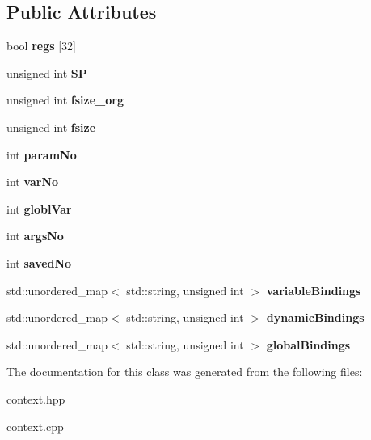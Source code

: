 \subsection*{Public Attributes}
\begin{DoxyCompactItemize}
\item 
\mbox{\label{class_context_a4154d80f029cc2e348126ca70dd43e94}} 
bool {\bfseries regs} \mbox{[}32\mbox{]}
\item 
\mbox{\label{class_context_ac383af2b2294500f1cc0370946df81a6}} 
unsigned int {\bfseries SP}
\item 
\mbox{\label{class_context_a9f5e2ccd0d0d14543080829ebf2d4b5b}} 
unsigned int {\bfseries fsize\+\_\+org}
\item 
\mbox{\label{class_context_a3572ac8a19d4afe52f93236158b3ca6b}} 
unsigned int {\bfseries fsize}
\item 
\mbox{\label{class_context_aac2957f7942a067a4d61db0a9d5fa52b}} 
int {\bfseries param\+No}
\item 
\mbox{\label{class_context_a21e93552ced87fbc90e95fb1adefb4d1}} 
int {\bfseries var\+No}
\item 
\mbox{\label{class_context_a1eca674dabc9aacc22cb0b570fcebd46}} 
int {\bfseries globl\+Var}
\item 
\mbox{\label{class_context_a457cedbb97192ceee110548e3b8c0348}} 
int {\bfseries args\+No}
\item 
\mbox{\label{class_context_a789582cf84432865fc58b566c93f79bb}} 
int {\bfseries saved\+No}
\item 
\mbox{\label{class_context_af2d41b56e6c75c534ea01e9f9cc7b8de}} 
std\+::unordered\+\_\+map$<$ std\+::string, unsigned int $>$ {\bfseries variable\+Bindings}
\item 
\mbox{\label{class_context_a7cd52a34969792c3d414a9d2fb347d79}} 
std\+::unordered\+\_\+map$<$ std\+::string, unsigned int $>$ {\bfseries dynamic\+Bindings}
\item 
\mbox{\label{class_context_ab55f4a83656b1385d548507cfaa5e9f4}} 
std\+::unordered\+\_\+map$<$ std\+::string, unsigned int $>$ {\bfseries global\+Bindings}
\end{DoxyCompactItemize}


The documentation for this class was generated from the following files\+:\begin{DoxyCompactItemize}
\item 
context.\+hpp\item 
context.\+cpp\end{DoxyCompactItemize}

